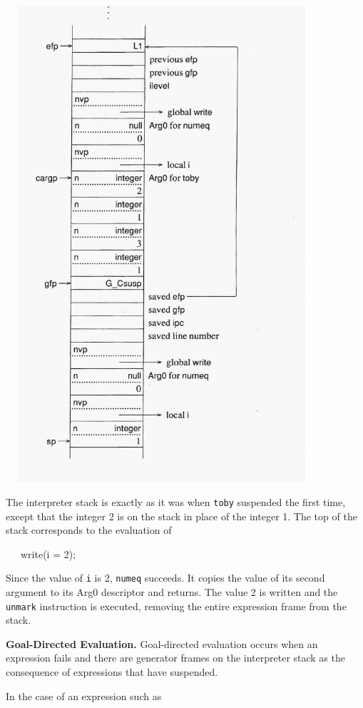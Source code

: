 \ \  \includegraphics[width=4.2752in,height=6.9508in]{ib-img/ib-img070.jpg} 


The interpreter stack is exactly as it was when \texttt{toby}
suspended the first time, except that the integer 2 is on the stack in
place of the integer 1. The top of the stack corresponds to the
evaluation of

{\ttfamily\mdseries
\ \ \ write(i = 2);}


Since the value of \texttt{i} is 2, \texttt{numeq} succeeds. It copies
the value of its second argument to its Arg0 descriptor and
returns. The value 2 is written and the \texttt{unmark} instruction is
executed, removing the entire expression frame from the stack.


\textbf{Goal-Directed Evaluation. }Goal-directed evaluation occurs
when an expression fails and there are generator frames on the
interpreter stack as the consequence of expressions that have
suspended.

In the case of an expression such as

